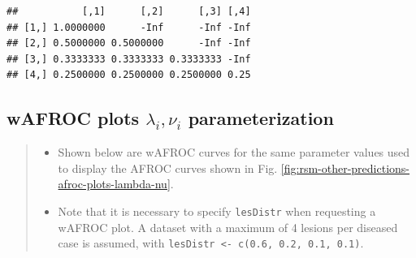 \documentclass[
]{book}
\newenvironment{Shaded}{\begin{snugshade}}{\end{snugshade}}
\newcommand{\AttributeTok}[1]{\textcolor[rgb]{0.77,0.63,0.00}{#1}}
\newcommand{\CommentTok}[1]{\textcolor[rgb]{0.56,0.35,0.01}{\textit{#1}}}
\newcommand{\ControlFlowTok}[1]{\textcolor[rgb]{0.13,0.29,0.53}{\textbf{#1}}}
\newcommand{\DecValTok}[1]{\textcolor[rgb]{0.00,0.00,0.81}{#1}}
\newcommand{\FunctionTok}[1]{\textcolor[rgb]{0.00,0.00,0.00}{#1}}
\newcommand{\NormalTok}[1]{#1}
\newcommand{\OtherTok}[1]{\textcolor[rgb]{0.56,0.35,0.01}{#1}}
\newcommand{\SpecialCharTok}[1]{\textcolor[rgb]{0.00,0.00,0.00}{#1}}
\newcommand{\StringTok}[1]{\textcolor[rgb]{0.31,0.60,0.02}{#1}}
\providecommand{\tightlist}{%
  \setlength{\itemsep}{0pt}\setlength{\parskip}{0pt}}
\begin{document}
\begin{verbatim}
##           [,1]      [,2]      [,3] [,4]
## [1,] 1.0000000      -Inf      -Inf -Inf
## [2,] 0.5000000 0.5000000      -Inf -Inf
## [3,] 0.3333333 0.3333333 0.3333333 -Inf
## [4,] 0.2500000 0.2500000 0.2500000 0.25
\end{verbatim}

\hypertarget{wafroc-plots-lambda_i-nu_i-parameterization}{%
\subsection{\texorpdfstring{wAFROC plots \(\lambda_i, \nu_i\) parameterization}{wAFROC plots \textbackslash lambda\_i, \textbackslash nu\_i parameterization}}\label{wafroc-plots-lambda_i-nu_i-parameterization}}

\begin{quote}
\begin{itemize}
\tightlist
\item
  Shown below are wAFROC curves for the same parameter values used to display the AFROC curves shown in Fig. \ref{fig:rsm-other-predictions-afroc-plots-lambda-nu}.
\item
  Note that it is necessary to specify \texttt{lesDistr} when requesting a wAFROC plot. A dataset with a maximum of 4 lesions per diseased case is assumed, with \texttt{lesDistr\ \textless{}-\ c(0.6,\ 0.2,\ 0.1,\ 0.1)}.
\end{itemize}
\end{quote}

\begin{Shaded}
\end{Shaded}
\end{document}
